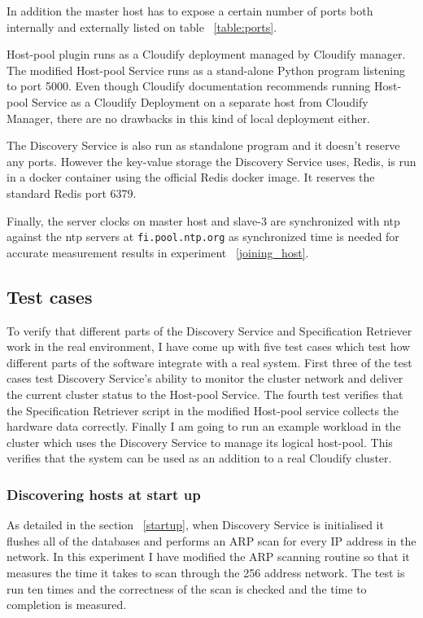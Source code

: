 In addition the master host has to expose a certain number of ports both internally and externally listed on table ~\ref{table:ports}.

Host-pool plugin runs as a Cloudify deployment managed by Cloudify manager. The modified Host-pool Service runs as a stand-alone Python program listening to port 5000. Even though Cloudify documentation recommends running Host-pool Service as a Cloudify Deployment on a separate host from Cloudify Manager, there are no drawbacks in this kind of local deployment either. 

The Discovery Service is also run as standalone program and it doesn't reserve any ports. However the key-value storage the Discovery Service uses, Redis, is run in a docker container using the official Redis docker image. It reserves the standard  Redis port 6379.

Finally, the server clocks on master host and slave-3 are synchronized with ntp against the ntp servers at \verb|fi.pool.ntp.org| as synchronized time is needed for accurate measurement results in experiment ~\ref{joining_host}.
  

\subsection{Test cases}

To verify that different parts of the Discovery Service and Specification Retriever work in the real environment, I have come up with five test cases which test how different parts of the software integrate with a real system. First three of the test cases test Discovery Service's ability to monitor  the cluster network and deliver the current cluster status to the Host-pool Service. The fourth test verifies that the Specification Retriever script in the modified Host-pool service collects the hardware data correctly. Finally I am going to run an example workload in the cluster which uses the Discovery Service to manage its logical host-pool. This verifies that the system can be used as an addition to a real Cloudify cluster.

\subsubsection{Discovering hosts at start up}

As detailed in the section ~\ref{startup}, when Discovery Service is initialised it flushes all of the databases and performs an ARP scan for every IP address in the network. In this experiment I have modified the ARP scanning routine so that it measures the time it takes to scan through the 256 address network. The test is run ten times and the correctness of the scan is checked and the time to completion is measured.

